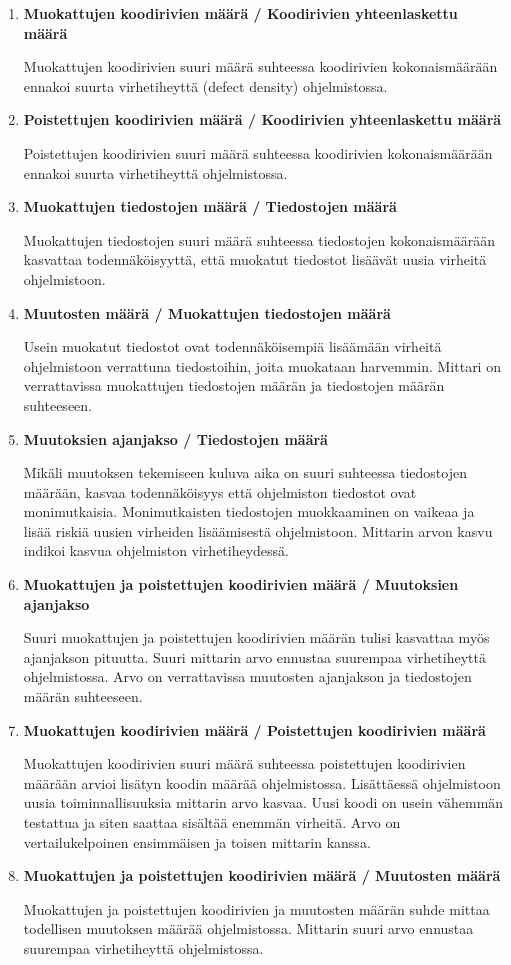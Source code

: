 \documentclass[finnish]{tktltiki2}
\theoremstyle{definition}
\theoremstyle{remark}
\begin{document}
\begin{enumerate}
    \item \textbf{Muokattujen koodirivien määrä / Koodirivien yhteenlaskettu määrä}

        Muokattujen koodirivien suuri määrä suhteessa koodirivien kokonaismäärään ennakoi suurta virhetiheyttä (defect density) ohjelmistossa.
    \item \textbf{Poistettujen koodirivien määrä / Koodirivien yhteenlaskettu määrä}

        Poistettujen koodirivien suuri määrä suhteessa koodirivien kokonaismäärään ennakoi suurta virhetiheyttä ohjelmistossa.
    \item \textbf{Muokattujen tiedostojen määrä / Tiedostojen määrä}

        Muokattujen tiedostojen suuri määrä suhteessa tiedostojen kokonaismäärään kasvattaa todennäköisyyttä, että muokatut tiedostot lisäävät uusia virheitä ohjelmistoon.
    \item \textbf{Muutosten määrä / Muokattujen tiedostojen määrä}

        Usein muokatut tiedostot ovat todennäköisempiä lisäämään virheitä ohjelmistoon verrattuna tiedostoihin, joita muokataan harvemmin. Mittari on verrattavissa muokattujen tiedostojen määrän ja tiedostojen määrän suhteeseen.
    \item \textbf{Muutoksien ajanjakso / Tiedostojen määrä}

        Mikäli muutoksen tekemiseen kuluva aika on suuri suhteessa tiedostojen määrään, kasvaa todennäköisyys että ohjelmiston tiedostot ovat monimutkaisia. Monimutkaisten tiedostojen muokkaaminen on vaikeaa ja lisää riskiä uusien virheiden lisäämisestä ohjelmistoon. Mittarin arvon kasvu indikoi kasvua ohjelmiston virhetiheydessä.
    \item \textbf{Muokattujen ja poistettujen koodirivien määrä / Muutoksien ajanjakso}

       Suuri muokattujen ja poistettujen koodirivien määrän tulisi kasvattaa myös ajanjakson pituutta. Suuri mittarin arvo ennustaa suurempaa virhetiheyttä ohjelmistossa. Arvo on verrattavissa muutosten ajanjakson ja tiedostojen määrän suhteeseen. 

    \item \textbf{Muokattujen koodirivien määrä / Poistettujen koodirivien määrä}

        Muokattujen koodirivien suuri määrä suhteessa poistettujen koodirivien määrään arvioi lisätyn koodin määrää ohjelmistossa. Lisättäessä ohjelmistoon uusia toiminnallisuuksia mittarin arvo kasvaa. Uusi koodi on usein vähemmän testattua ja siten saattaa sisältää enemmän virheitä. Arvo on vertailukelpoinen ensimmäisen ja toisen mittarin kanssa.
    \item \textbf{Muokattujen ja poistettujen koodirivien määrä / Muutosten määrä}

        Muokattujen ja poistettujen koodirivien ja muutosten määrän suhde mittaa todellisen muutoksen määrää ohjelmistossa. Mittarin suuri arvo ennustaa suurempaa virhetiheyttä ohjelmistossa. 
\end{enumerate}
\end{document}
